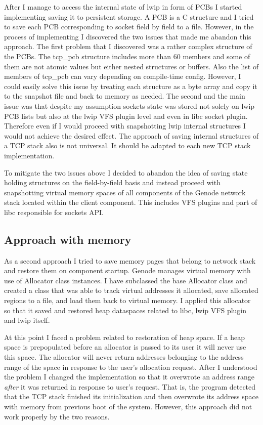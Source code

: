 After I manage to access the internal state of lwip in form of PCBs I started
implementing saving it to persistent storage. A PCB is a C structure and I
tried to save each PCB corresponding to socket field by field to a file.
However, in the process of implementing I discovered the two issues that made
me abandon this approach. The first problem that I discovered was a rather
complex structure of the PCBs. The tcp\_pcb structure includes more than 60
members and some of them are not atomic values but either nested structures or
buffers. Also the list of members of tcp\_pcb can vary depending on compile-time
config. However, I could easily solve this issue by treating each structure as
a byte array and copy it to the snapshot file and back to memory as needed. The
second and the main issue was that despite my assumption sockets state was
stored not solely on lwip PCB lists but also at the lwip VFS plugin level and
even in libc socket plugin. Therefore even if I would proceed with snapshotting
lwip internal structures I would not achieve the desired effect. The approach
of saving internal structures of a TCP stack also is not universal. It should be
adapted to each new TCP stack implementation.

To mitigate the two issues above I decided to abandon the idea of saving state
holding structures on the field-by-field basis and instead proceed with
snapshotting virtual memory spaces of all components of the Genode network stack
located within the client component. This includes VFS plugins and part of libc
responsible for sockets API.

\subsection{Approach with memory}
As a second approach I tried to save memory pages that belong to network stack
and restore them on component startup. Genode manages virtual memory with use
of Allocator class instances. I have subclassed the base Allocator class and
created a class that was able to track virtual addresses it allocated, save
allocated regions to a file, and load them back to virtual memory. I applied
this allocator so that it saved and restored heap dataspaces related to libc,
lwip VFS plugin and lwip itself.

At this point I faced a problem related to restoration of heap space. If a heap
space is prepopulated before an allocator is passed to its user it will never
use this space. The allocator will never return addresses belonging to the
address range of the space in response to the user's allocation request. After
I understood the problem I changed the implementation so that it overwrote an
address range \textit{after} it was returned in response to user's request.
That is, the program detected that the TCP stack finished its initialization
and then overwrote its address space with memory from previous boot of the
system. However, this approach did not work properly by the two reasons. 

